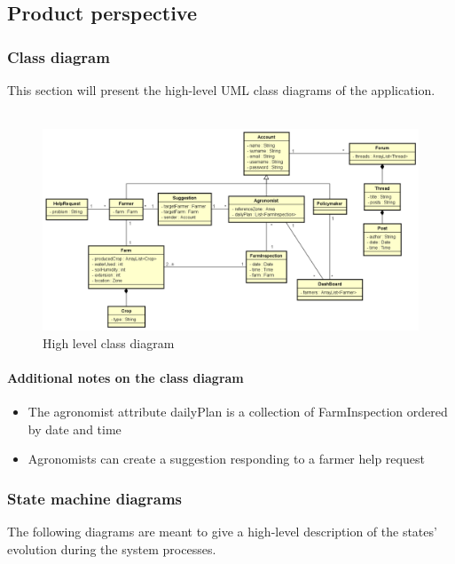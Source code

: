 \subsection{Product perspective}
\subsubsection{Class diagram}
This section will present the high-level UML class diagrams of the application.
\\\\
\begin{figure}[H]
    \centering
    \includegraphics[width=\textwidth,height=\textheight,keepaspectratio]{Images/HighLevelUMLcut.png}
    \caption{\label{fig:high_level_uml}High level class diagram}
\end{figure}

\bigskip
\paragraph{Additional notes on the class diagram}
\begin{itemize}
    \item The agronomist attribute dailyPlan is a collection of FarmInspection ordered by date and time
    \item Agronomists can create a suggestion responding to a farmer help request
\end{itemize}

\newpage
\subsubsection{State machine diagrams}
The following diagrams are meant to give a high-level description of the states' evolution during the system processes.
\\\\


